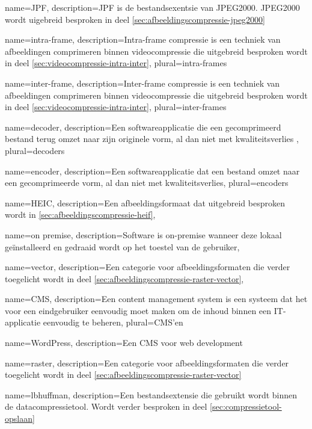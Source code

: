 {
	name={JPF},
	description={JPF is de bestandsexentsie van JPEG2000. JPEG2000 wordt uigebreid besproken in deel \ref{sec:afbeeldingscompressie-jpeg2000}}
}

{
	name={intra-frame},
	description={Intra-frame compressie is een techniek van afbeeldingen comprimeren binnen videocompressie die uitgebreid besproken wordt in deel \ref{sec:videocompressie-intra-inter}},
	plural={intra-frames}
}

{
	name={inter-frame},
	description={Inter-frame compressie is een techniek van afbeeldingen comprimeren binnen videocompressie die uitgebreid besproken wordt in deel \ref{sec:videocompressie-intra-inter}},
	plural={inter-frames}
}

{
	name={decoder},
	description={Een softwareapplicatie die een gecomprimeerd bestand terug omzet naar zijn originele vorm, al dan niet met kwaliteitsverlies },
	plural={decoders}
}

{
	name={encoder},
	description={Een softwareapplicatie dat een bestand omzet naar een gecomprimeerde vorm, al dan niet met kwaliteitsverlies},
	plural={encoders}
}

{
	name={HEIC},
	description={Een afbeeldingsformaat dat uitgebreid besproken wordt in \ref{sec:afbeeldingscompressie-heif}},
}

{
	name={on premise},
	description={Software is on-premise wanneer deze lokaal geïnstalleerd en gedraaid wordt op het toestel van de gebruiker},
}

{
	name={vector},
	description={Een categorie voor afbeeldingsformaten die verder toegelicht wordt in deel \ref{sec:afbeeldingscompressie-raster-vector}},
}

{
	name={CMS},
	description={Een content management system is een systeem dat het voor een eindgebruiker eenvoudig moet maken om de inhoud binnen een IT-applicatie eenvoudig te beheren},
	plural={CMS'en}
}

{
	name={WordPress},
	description={Een CMS voor web development}
}

{
	name={raster},
	description={Een categorie voor afbeeldingsformaten die verder toegelicht wordt in deel \ref{sec:afbeeldingscompressie-raster-vector}}
}

{
	name={lbhuffman},
	description={Een bestandsextensie die gebruikt wordt binnen de datacompressietool. Wordt verder besproken in deel \ref{sec:compressietool-opslaan}}
}

